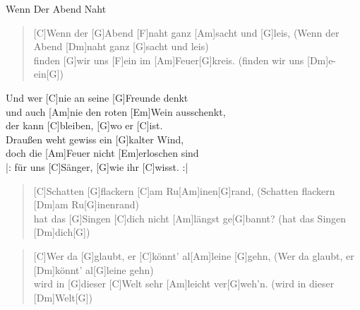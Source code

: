 \begin{song}{Wenn Der Abend Naht}{}

    \begin{verse}  
        [C]Wenn der [G]Abend [F]naht ganz [Am]sacht und [G]leis, (Wenn der Abend [Dm]naht ganz [G]sacht und leis) \\
        [C]finden [G]wir uns [F]ein im [Am]Feuer[G]kreis. (finden wir uns [Dm]e-ein[G])
    \end{verse}  

    \begin{chorus}
        Und wer [C]nie an seine [G]Freunde denkt \\
        und auch [Am]nie den roten [Em]Wein ausschenkt, \\
        der kann [C]bleiben, [G]wo er [C]ist. \\
        Draußen weht gewiss ein [G]kalter Wind, \\
        doch die [Am]Feuer nicht [Em]erloschen sind \\
        |: für uns [C]Sänger, [G]wie ihr [C]wisst. :|
    \end{chorus}

    \begin{verse}  
        [C]Schatten [G]flackern [C]am Ru[Am]inen[G]rand, (Schatten flackern [Dm]am Ru[G]inenrand) \\
        [C]hat das [G]Singen [C]dich nicht [Am]längst ge[G]bannt? (hat das Singen [Dm]dich[G])
    \end{verse}  


    \begin{verse}  
        [C]Wer da [G]glaubt, er [C]könnt' al[Am]leine [G]gehn, (Wer da glaubt, er [Dm]könnt' al[G]leine gehn) \\
        [C]wird in [G]dieser [C]Welt sehr [Am]leicht ver[G]weh'n. (wird in dieser [Dm]Welt[G])
    \end{verse}  


\end{song}
